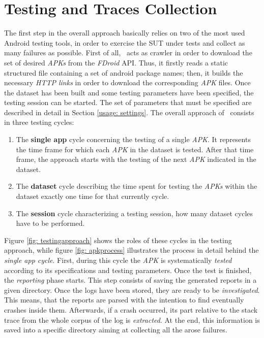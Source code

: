 \section{Testing and Traces Collection}
\label{approach:testing}
The first step in the overall approach basically relies on two of the most used Android testing tools, in order to exercise the SUT under tests and collect as many failures as possible. 
First of all, \toolname\ acts as crawler in order to download the set of desired \textit{APKs} from the \textit{FDroid} API. 
Thus, it firstly reads a static structured file containing a set of android package names; then, it builds the necessary \textit{HTTP links} in order to download the corresponding \textit{APK} files. 
Once the dataset has been built and some testing parameters have been specified, the testing session can be started. 
The set of parameters that must be specified are described in detail in Section \ref{usage: settings}.
The overall approach of \toolname\ consists in three testing cycles: 
\begin{enumerate}
\item 
The \textbf{single app} cycle concerning the testing of a single \textit{APK}. It represents the time frame for which each \textit{APK} in the dataset is tested. After that time frame, the approach starts with the testing of the next \textit{APK} indicated in the dataset. 
\item The \textbf{dataset} cycle describing the time spent for testing the \textit{APKs} within the dataset exactly one time for that currently cycle. 
\item The \textbf{session} cycle characterizing a testing session, \ie how many dataset cycles have to be performed. 
\end{enumerate}
Figure \ref{fig: testingapproach} shows the roles of these cycles in the testing approach, while figure \ref{fig: apkprocess} illustrates the process in detail behind the \textit{single app cycle}. 
First, during this cycle the \textit{APK} is systematically \textit{tested} according to its specifications and testing parameters. 
Once the test is finished, the \textit{reporting} phase starts. 
This step consists of saving the generated reports in a given directory. 
Once the logs have been stored, they are ready to be \textit{investigated}. This means, that the reports are parsed with the intention to find eventually crashes inside them. 
Afterwards, if a crash occurred, its part relative to the stack trace from the whole corpus of the log is \textit{extracted}. At the end, this information is saved into a specific directory aiming at collecting all the arose failures.

